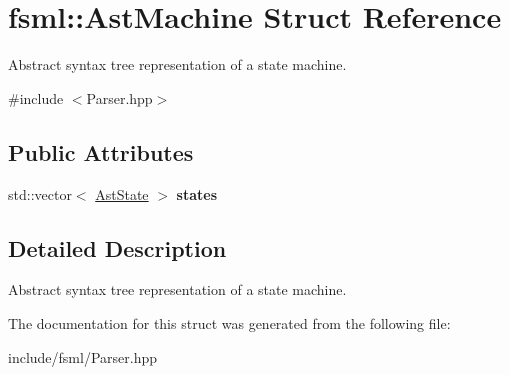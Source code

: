 \hypertarget{structfsml_1_1AstMachine}{\section{fsml\-:\-:Ast\-Machine Struct Reference}
\label{structfsml_1_1AstMachine}
}


Abstract syntax tree representation of a state machine.  




{\ttfamily \#include $<$Parser.\-hpp$>$}

\subsection*{Public Attributes}
\begin{DoxyCompactItemize}
\item 
\hypertarget{structfsml_1_1AstMachine_a007b560f2e500f7f51c570f0316843e2}{std\-::vector$<$ \hyperlink{structfsml_1_1AstState}{Ast\-State} $>$ {\bfseries states}}\label{structfsml_1_1AstMachine_a007b560f2e500f7f51c570f0316843e2}

\end{DoxyCompactItemize}


\subsection{Detailed Description}
Abstract syntax tree representation of a state machine. 



The documentation for this struct was generated from the following file\-:\begin{DoxyCompactItemize}
\item 
include/fsml/Parser.\-hpp\end{DoxyCompactItemize}
